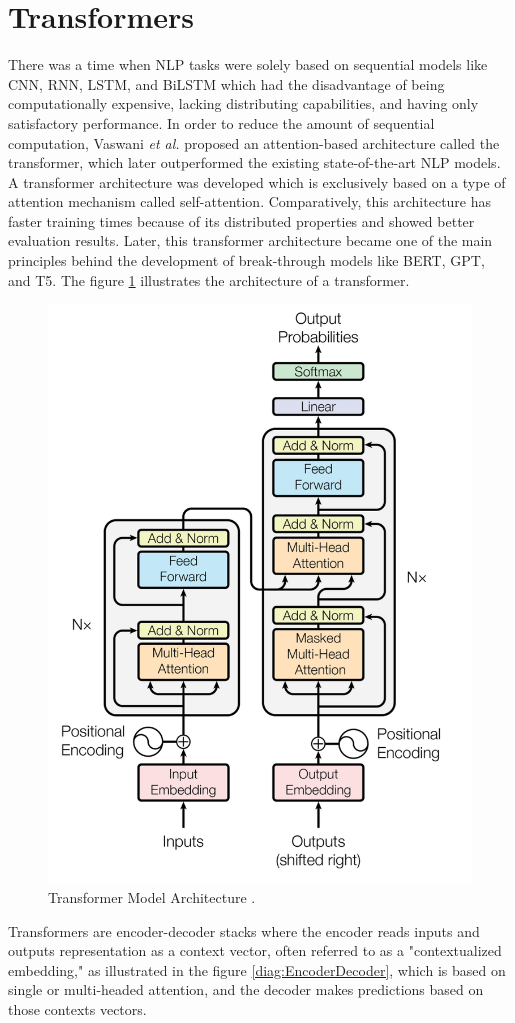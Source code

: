 \documentclass[%
	BCOR=8mm, %
	DIV=12,
	toc=bibliography, %
	toc=listof, %
	oneside, %
	egregdoesnotlikesansseriftitles, %
	]{scrbook}
\begin{document}
\section{Transformers}
\label{section: transformers}
There was a time when NLP tasks were solely based on sequential models like CNN, RNN, LSTM, and BiLSTM which had the disadvantage of being computationally expensive, lacking distributing capabilities, and having only satisfactory performance. In order to reduce the amount of sequential computation,  Vaswani \textit{et al.} \cite{vaswani_attention_2017} proposed an attention-based architecture called the transformer, which later outperformed the existing state-of-the-art NLP models. A transformer architecture was developed which is exclusively based on a type of attention mechanism called self-attention. Comparatively, this architecture has faster training times because of its distributed properties and showed better evaluation results. 
Later, this transformer architecture became one of the main principles behind the development of break-through models like BERT, GPT, and T5. The figure \ref{diag:TransformerArchitecture} illustrates the architecture of a transformer.
\begin{figure}[H]
    \centering
    \includegraphics[width=.55\textwidth]{img/TransformerArchitecture.png}
    \caption[Diagram of Transformer Architecture.]{Transformer Model Architecture \cite{vaswani_attention_2017}.}
    \label{diag:TransformerArchitecture}
\end{figure}
Transformers are encoder-decoder stacks where the encoder reads inputs and outputs representation as a context vector, often referred to as a "contextualized embedding," as illustrated in the figure \ref{diag:EncoderDecoder}, which is based on single or multi-headed attention, and the decoder makes predictions based on those contexts vectors.\\
\end{document}
